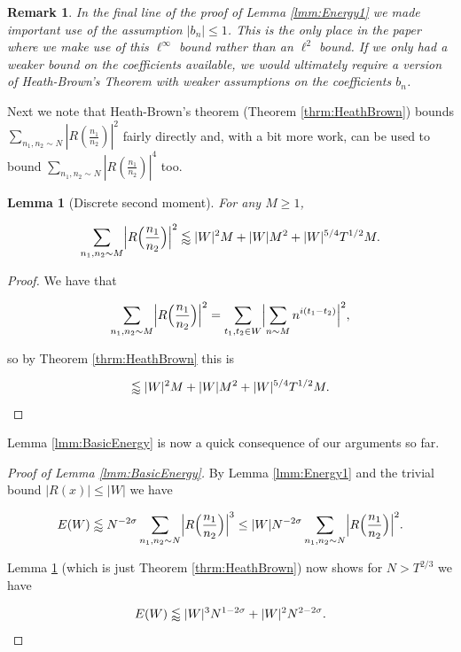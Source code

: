 \documentclass{amsart}
\theoremstyle{plain}
\newtheorem{lmm}[thrm]{Lemma}
\newtheorem*{rmk}{Remark}
\numberwithin{equation}{section}
\begin{document}
%
%

\begin{rmk}
In the final line of the proof of Lemma \ref{lmm:Energy1} we made important use of the assumption $|b_n|\le 1$. This is the only place in the paper where we make use of this $\ell^\infty$ bound rather than an $\ell^2$ bound. If we only had a weaker bound on the coefficients available, we would ultimately require a version of Heath-Brown's Theorem with weaker assumptions on the coefficients $b_n$.
\end{rmk}

%
%

Next we note that Heath-Brown's theorem (Theorem \ref{thrm:HeathBrown}) bounds $\sum_{n_1,n_2\sim N}|R(\frac{n_1}{n_2})|^2$ fairly directly and, with a bit more work, can be used to bound $\sum_{n_1,n_2\sim N}|R(\frac{n_1}{n_2})|^4$ too.

\begin{lmm}[Discrete second moment] \label{lmm:R2bound} For any $M \ge 1$, 

\[ \sum_{n_1,n_2\sim M}\Bigl|R\Bigl(\frac{n_1}{n_2}\Bigr)\Bigr|^2 \lessapprox  |W|^2 M + |W| M^2 + |W|^{5/4}T^{1/2} M. \]

\end{lmm}

\begin{proof}
We have that

\[
\sum_{n_1, n_2 \sim M}\Bigl|R\Bigl(\frac{n_1}{n_2}\Bigr)\Bigr|^2=\sum_{t_1,t_2\in W}\Bigl|\sum_{n\sim M} n^{i(t_1-t_2)}\Bigr|^2,
\]

so by Theorem \ref{thrm:HeathBrown} this is

\[
\lessapprox |W|^2 M + |W| M^2 + |W|^{5/4}T^{1/2} M.\qedhere
\]
\end{proof}

%
%


Lemma \ref{lmm:BasicEnergy} is now a quick consequence of our arguments so far.
\begin{proof}[Proof of Lemma \ref{lmm:BasicEnergy}]
By Lemma \ref{lmm:Energy1} and the trivial bound $|R(x)|\le |W|$ we have

\[
E(W)\lessapprox N^{-2\sigma}\sum_{n_1,n_2\sim N}\Bigl|R\Bigl(\frac{n_1}{n_2}\Bigr)\Bigr|^3\le |W|N^{-2\sigma}\sum_{n_1,n_2\sim N}\Bigl|R\Bigl(\frac{n_1}{n_2}\Bigr)\Bigr|^2.
\]

Lemma \ref{lmm:R2bound} (which is just Theorem \ref{thrm:HeathBrown}) now shows for $N>T^{2/3}$ we have

\[
E(W)\lessapprox |W|^3N^{1-2\sigma}+|W|^2N^{2-2\sigma}.\qedhere
\]
\end{proof}
\end{document}
